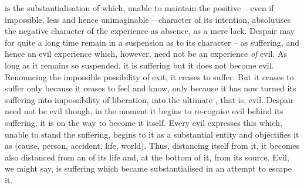  is the {substantialisation} of  which, unable to
maintain the positive -- even if impossible, less and hence
unimaginable -- character of its intention, absolutises the negative character
of the experience as absence, as a mere lack.  Despair may for quite a long time
remain in a suspension as to its character -- as suffering, and hence an evil
experience which, 
however, need not be an experience {\em of} evil. As long as it remains so
suspended, it is suffering but it does not become evil. Renouncing the
impossible possibility of exit, it ceases to suffer. But it ceases to suffer
only because it ceases to feel and know, only because it has now turned its
suffering into impossibility of liberation, into 
the ultimate , that is, evil. Despair need not be evil
though, in the moment it begins to re-cognise evil behind its suffering, it is
on the way to become it itself. Every evil expresses this  which,
unable to stand the suffering, begins to  it as a substantial
entity and {objectifies} it as  (cause, person, accident, life,
world). Thus, distancing itself from it, it becomes also distanced from an 
 of its life and, at the bottom of it, from its source. Evil, we
might say, is suffering which became 
substantialised in an attempt to escape it.


